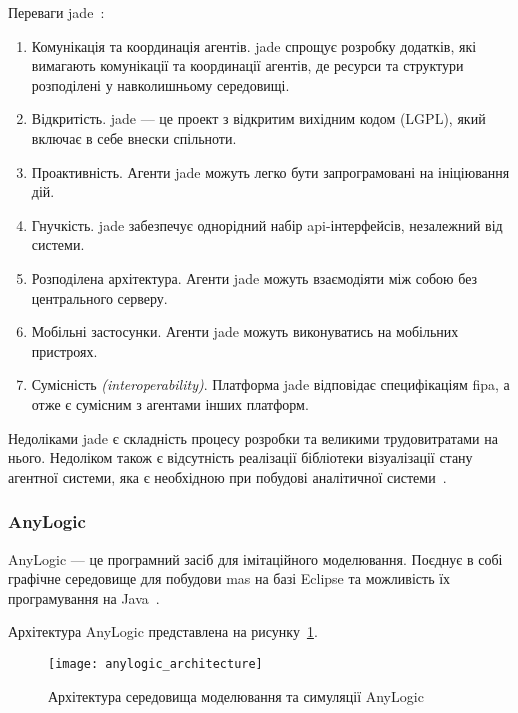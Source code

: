 Переваги \acrshort{jade}~\cite{Bellifemine2003}:
\begin{enumerate}
	\item Комунікація та координація агентів. \acrshort{jade} спрощує розробку додатків, які вимагають комунікації та координації агентів, де ресурси та структури розподілені у навколишньому середовищі.
	\item Відкритість. \acrshort{jade} --- це проект з відкритим вихідним кодом (LGPL), який включає в себе внески спільноти. 
	\item Проактивність. Агенти \acrshort{jade} можуть легко бути запрограмовані на ініціювання дій. 
	\item Гнучкість. \acrshort{jade} забезпечує однорідний набір \acrshort{api}-інтерфейсів, незалежний від системи.
	\item Розподілена архітектура. Агенти \acrshort{jade} можуть взаємодіяти між собою без центрального серверу. 
	\item Мобільні застосунки. Агенти \acrshort{jade} можуть виконуватись на мобільних пристроях.
	\item Сумісність \textit{(interoperability)}. Платформа \acrshort{jade} відповідає специфікаціям \acrshort{fipa}, а отже є сумісним з агентами інших платформ.
\end{enumerate}

Недоліками \acrshort{jade} є складність процесу розробки та великими трудовитратами на нього. 
Недоліком також є відсутність реалізації бібліотеки візуалізації стану агентної системи, яка є необхідною при побудові аналітичної системи~\cite{Kravari2015}.

\subsubsection{AnyLogic}
AnyLogic --- це програмний засіб для імітаційного моделювання. 
Поєднує в собі графічне середовище для побудови \acrshort{mas} на базі Eclipse та можливість їх програмування на Java~\cite{anylogic,Kravari2015}.

Архітектура AnyLogic представлена на рисунку~\ref{fig:anylogic_architecture}.

\begin{figure}[H]
	\centering
	\texttt{[image: anylogic\_architecture]}
	\caption{Архітектура середовища моделювання та симуляції AnyLogic~\cite{Borshchev2002}}
	\label{fig:anylogic_architecture}
\end{figure}

